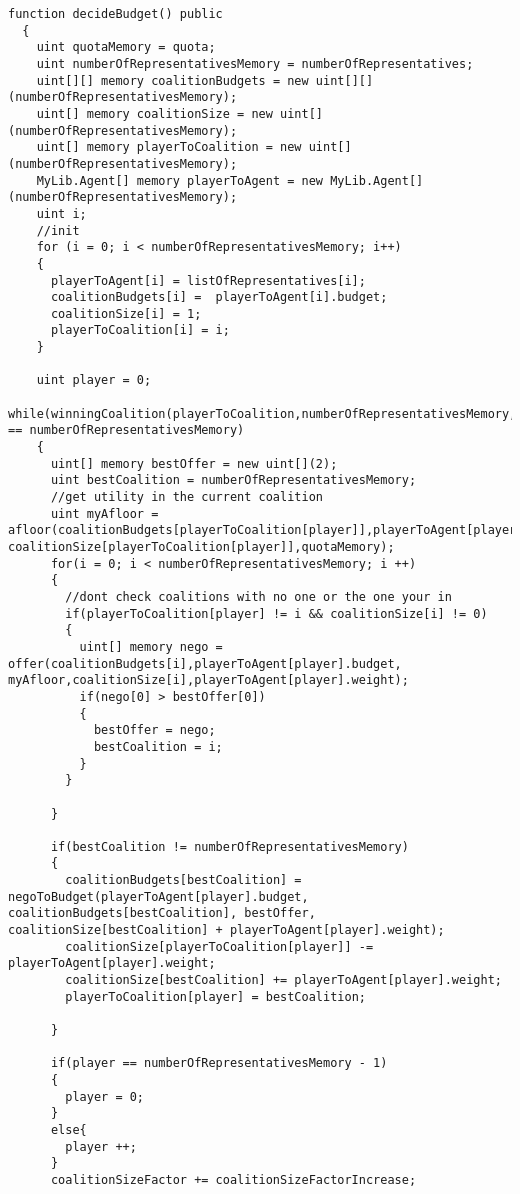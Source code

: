 \begin{lstlisting}
function decideBudget() public
  {
    uint quotaMemory = quota;
    uint numberOfRepresentativesMemory = numberOfRepresentatives;
    uint[][] memory coalitionBudgets = new uint[][](numberOfRepresentativesMemory);
    uint[] memory coalitionSize = new uint[](numberOfRepresentativesMemory);
    uint[] memory playerToCoalition = new uint[](numberOfRepresentativesMemory);
    MyLib.Agent[] memory playerToAgent = new MyLib.Agent[](numberOfRepresentativesMemory);
    uint i;
    //init
    for (i = 0; i < numberOfRepresentativesMemory; i++)
    {
      playerToAgent[i] = listOfRepresentatives[i];
      coalitionBudgets[i] =  playerToAgent[i].budget;
      coalitionSize[i] = 1;
      playerToCoalition[i] = i;
    }

    uint player = 0;
    while(winningCoalition(playerToCoalition,numberOfRepresentativesMemory,playerToAgent) == numberOfRepresentativesMemory)
    {
      uint[] memory bestOffer = new uint[](2);
      uint bestCoalition = numberOfRepresentativesMemory;
      //get utility in the current coalition
      uint myAfloor = afloor(coalitionBudgets[playerToCoalition[player]],playerToAgent[player].budget, coalitionSize[playerToCoalition[player]],quotaMemory);
      for(i = 0; i < numberOfRepresentativesMemory; i ++)
      {
        //dont check coalitions with no one or the one your in
        if(playerToCoalition[player] != i && coalitionSize[i] != 0)
        {
          uint[] memory nego = offer(coalitionBudgets[i],playerToAgent[player].budget, myAfloor,coalitionSize[i],playerToAgent[player].weight);
          if(nego[0] > bestOffer[0])
          {
            bestOffer = nego;
            bestCoalition = i;
          }
        }

      }

      if(bestCoalition != numberOfRepresentativesMemory)
      {
        coalitionBudgets[bestCoalition] = negoToBudget(playerToAgent[player].budget, coalitionBudgets[bestCoalition], bestOffer, coalitionSize[bestCoalition] + playerToAgent[player].weight);
        coalitionSize[playerToCoalition[player]] -= playerToAgent[player].weight;
        coalitionSize[bestCoalition] += playerToAgent[player].weight;
        playerToCoalition[player] = bestCoalition;

      }

      if(player == numberOfRepresentativesMemory - 1)
      {
        player = 0;
      }
      else{
        player ++;
      }
      coalitionSizeFactor += coalitionSizeFactorIncrease;


\end{lstlisting}
